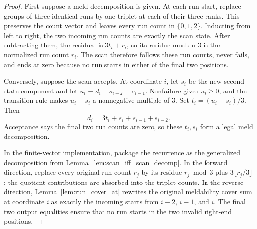 \begin{proof}

\leanok
  First suppose a meld decomposition is given.  At each run start, replace
  groups of three identical runs by one triplet at each of their three
  ranks.  This preserves the count vector and leaves every run count in
  \(\{0,1,2\}\).  Inducting from left to right, the two incoming run counts
  are exactly the scan state.  After subtracting them, the residual is
  \(3t_i+r_i\), so its residue modulo \(3\) is the normalized run count
  \(r_i\).  The scan therefore follows these run counts, never fails, and
  ends at zero because no run starts in either of the final two positions.

  Conversely, suppose the scan accepts.  At coordinate \(i\), let \(s_i\)
  be the new second state component and let
  \(u_i=d_i-s_{i-2}-s_{i-1}\).  Nonfailure gives \(u_i\geq0\), and the
  transition rule makes \(u_i-s_i\) a nonnegative multiple of \(3\).
  Set \(t_i=(u_i-s_i)/3\).  Then
  \[
    d_i=3t_i+s_i+s_{i-1}+s_{i-2}.
  \]
  Acceptance says the final two run counts are zero, so these \(t_i,s_i\)
  form a legal meld decomposition.

  In the finite-vector implementation, package the recurrence as the
  generalized decomposition from Lemma~\ref{lem:scan_iff_scan_decomp}.  In
  the forward direction, replace every original run count \(r_j\) by its
  residue \(r_j\bmod 3\) plus \(3\lfloor r_j/3\rfloor\); the quotient
  contributions are absorbed into the triplet counts.  In the reverse
  direction, Lemma~\ref{lem:run_cover_at} rewrites the original meldability
  cover sum at coordinate \(i\) as exactly the incoming starts from
  \(i-2\), \(i-1\), and \(i\).  The final two output equalities ensure
  that no run starts in the two invalid right-end positions.
\end{proof}

